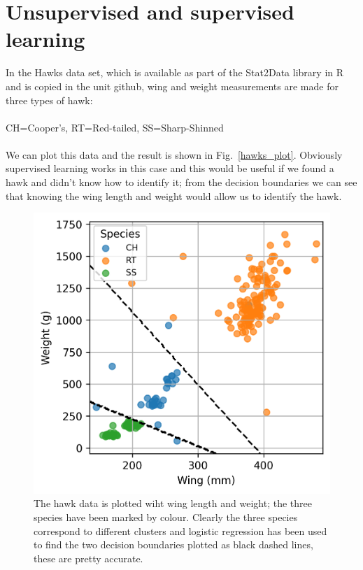 \documentclass[12pt]{article}
\begin{document}
\section*{Unsupervised and supervised learning}

In the Hawks data set, which is available as part of the Stat2Data
library in R and is copied in the unit github, wing and weight measurements are made for three types of hawk:\\
\\
CH=Cooper's, RT=Red-tailed, SS=Sharp-Shinned\\
\\
We can plot this data and the result is shown in Fig.~\ref{hawks_plot}. Obviously supervised learning works in this case and this would be useful if we found a hawk and didn't know how to identify it; from the decision boundaries we can see that knowing the wing length and weight would allow us to identify the hawk.

\begin{figure}[htb]
\begin{center}  
  \includegraphics{hawks_plot.png}
\end{center}
\caption{The hawk data is plotted wiht wing length and weight; the three species have been marked by colour. Clearly the three species correspond to different clusters and logistic regression has been used to find the two decision boundaries plotted as black dashed lines, these are pretty accurate.\label{fig:hawks_plot}}
\end{figure}
\end{document}
